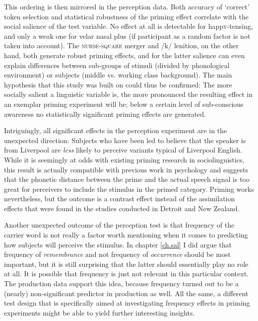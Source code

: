 This ordering is then mirrored in the perception data.
Both accuracy of `correct' token selection and statistical robustness of the priming effect correlate with the social salience of the test variable.
No effect at all is detectable for happ\textsc{y}-tensing, and only a weak one for velar nasal plus (if participant as a random factor is not taken into account).
The \textsc{nurse}-\textsc{square} merger and /k/ lenition, on the other hand, both generate robust priming effects, and for the latter salience can even explain differences between sub-groups of stimuli (divided by phonological environment) or subjects (middle vs. working class background).
The main hypothesis that this study was built on could thus be confirmed: The more socially salient a linguistic variable is, the more pronounced the resulting effect in an exemplar priming experiment will be; below a certain level of sub-conscious awareness no statistically significant priming effects are generated.

Intriguingly, all significant effects in the perception experiment are in the unexpected direction: Subjects who have been led to believe that the speaker is from Liverpool are \emph{less} likely to perceive variants typical of Liverpool English.
While it is seemingly at odds with existing priming research in sociolinguistics, this result is actually compatible with previous work in psychology and suggests that the phonetic distance between the prime and the actual speech signal is too great for perceivers to include the stimulus in the primed category.
Priming works nevertheless, but the outcome is a contrast effect instead of the assimilation effects that were found in the studies conducted in Detroit and New Zealand.

Another unexpected outcome of the perception test is that frequency of the carrier word is not really a factor worth mentioning when it comes to predicting how subjects will perceive the stimulus.
In chapter \ref{ch.sal} I did argue that frequency of \emph{remembrance} and not frequency of \emph{occurrence} should be most important, but it is still surprising that the latter should essentially play no role at all.
It is possible that frequency is just not relevant in this particular context.
The production data support this idea, because frequency turned out to be a (nearly) non-significant predictor in production as well.
All the same, a different test design that is specifically aimed at investigating frequency effects in priming experiments might be able to yield further interesting insights.

